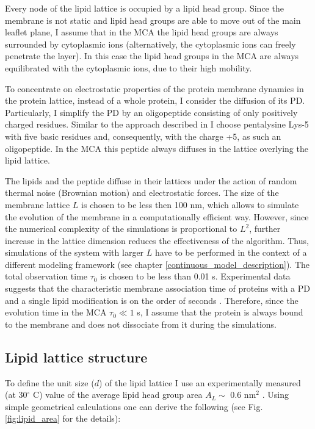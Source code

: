 Every node of the lipid lattice is occupied by a lipid head group. Since the membrane is not static and lipid head groups are able to move out of the main leaflet plane, I assume that in the MCA the lipid head groups are always surrounded by cytoplasmic ions (alternatively, the cytoplasmic ions can freely penetrate the layer). In this case the lipid head groups in the MCA are always equilibrated with the cytoplasmic ions, due to their high mobility.

To concentrate on electrostatic properties of the protein membrane dynamics in the protein lattice, instead of a whole protein, I consider the diffusion of its PD. Particularly, I simplify the PD by an oligopeptide consisting of only positively charged residues. Similar to the approach described in \cite{Denisov1998} I choose pentalysine Lys-5 with five basic residues and, consequently, with the charge +5, as such an oligopeptide. In the MCA this peptide always diffuses in the lattice overlying the lipid lattice.

The lipids and the peptide diffuse in their lattices under the action of random thermal noise (Brownian motion) and electrostatic forces. The size of the membrane lattice $L$ is chosen to be less then 100 nm, which allows to simulate the evolution of the membrane in a computationally efficient way. However, since the numerical complexity of the simulations is proportional to $L^2$, further increase in the lattice dimension reduces the effectiveness of the algorithm. Thus, simulations of the system with larger $L$ have to be performed in the context of a different modeling framework (see chapter \ref{continuous_model_description}). The total observation time $\tau_0$ is chosen to be less than 0.01 s. Experimental data suggests that the characteristic membrane association time of proteins with a PD and a single lipid modification is on the order of seconds \cite{Fivaz2003}. Therefore, since the evolution time in the MCA $\tau_0\ll1$ s, I assume that the protein is always bound to the membrane and does not dissociate from it during the simulations.

\subsection{Lipid lattice structure}
\label{model_description}

To define the unit size ($d$) of the lipid lattice I use an experimentally measured (at 30$^\circ$ C) value of the average lipid head group area $A_L \sim$ 0.6 nm$^2$ \cite{Petrache2000}. Using simple geometrical calculations one can derive the following (see Fig. \ref{fig:lipid_area} for the details):

